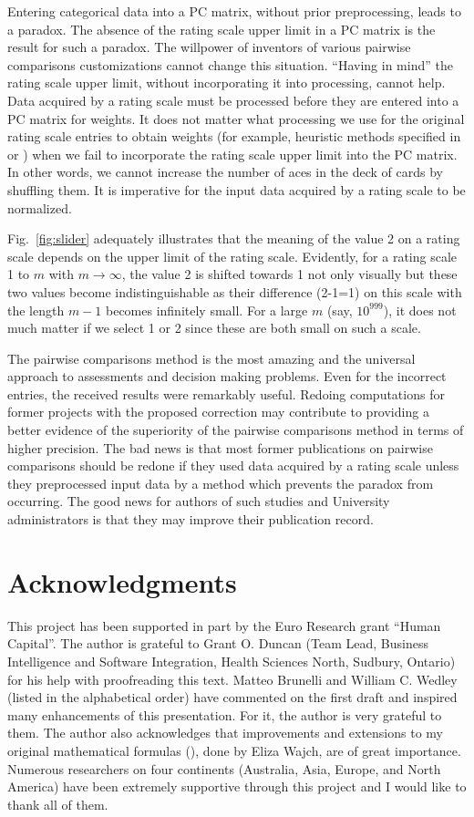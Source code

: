 \documentclass [12pt]{article}
\begin{document}
Entering categorical data into a PC matrix, without prior preprocessing, leads to a paradox. The absence of the rating scale upper limit in a PC matrix is the result for such a paradox. The willpower of inventors of various pairwise comparisons customizations   cannot change this situation. ``Having in mind'' the rating scale upper limit, without incorporating it into processing, cannot help. Data acquired by a rating scale must be processed before they are entered into a PC matrix for weights.
It does not matter what processing we use for the original rating scale entries to obtain weights (for example, heuristic methods specified in \cite{GM} or \cite{KK}) when we fail to incorporate the rating scale upper limit into the PC matrix. In other words, we cannot increase the number of aces in the deck of cards by shuffling them. It is imperative for the input data acquired by a rating scale to be normalized. 

Fig.~\ref{fig:slider} adequately illustrates that the meaning of the value 2 on a rating scale depends on the upper limit of the rating scale. Evidently, for a rating scale 1 to $m$ with $m \rightarrow \infty$, the value 2 is shifted towards 1 not only visually but these two values become indistinguishable as their difference (2-1=1) on this scale with the length $m-1$ becomes infinitely small. For a large $m$ (say, $10^{999}$), it does not much matter if we select 1 or 2 since these are both small on such a scale.

The pairwise comparisons method is the most amazing and the universal approach to assessments and decision making problems. Even for the incorrect entries, the received results were remarkably useful. Redoing computations for former projects with the proposed correction may contribute to providing a better evidence of the superiority of the pairwise comparisons method in terms of higher precision. The bad news is that most former publications on pairwise comparisons should be redone if they used data acquired by a rating scale unless they preprocessed input data by a method which prevents the paradox from occurring. The good news for authors of such studies and University administrators is that they may improve their publication record.

\section*{Acknowledgments}
This project has been supported in part by the Euro Research grant ``Human Capital''. 
The author is grateful to Grant O. Duncan (Team Lead, Business Intelligence and Software Integration, Health Sciences North, Sudbury, Ontario) for his help with proofreading this text. Matteo Brunelli and William C. Wedley (listed in the alphabetical order) have commented on the first draft and inspired many enhancements of this presentation. For it, the author is very grateful to them. The author also acknowledges that improvements and extensions to my original mathematical formulas (\cite{EW}), done by Eliza Wajch, are of great importance. Numerous researchers on four continents (Australia, Asia, Europe, and North America) have been extremely supportive through this project and I would like to thank all of them.
\end{document}

